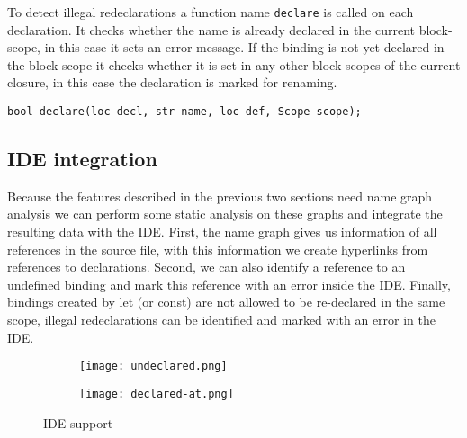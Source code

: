 To detect illegal redeclarations a function name \lstinline$declare$ is called on each declaration. It checks whether the name is already declared in the current block-scope, in this case it sets an error message. If the binding is not yet declared in the block-scope it checks whether it is set in any other block-scopes of the current closure, in this case the declaration is marked for renaming.

\begin{lstlisting}[language=rascal]
bool declare(loc decl, str name, loc def, Scope scope);
\end{lstlisting}

\subsection{IDE integration}
Because the features described in the previous two sections need name graph analysis we can perform some static analysis on these graphs and integrate the resulting data with the IDE. First, the name graph gives us information of all references in the source file, with this information we create hyperlinks from references to declarations. Second, we can also identify a reference to an undefined binding and mark this reference with an error inside the IDE. Finally, bindings created by let (or const) are not allowed to be re-declared in the same scope, illegal redeclarations can be identified and marked with an error in the IDE.

\begin{figure}
\centering

\begin{subfigure}{.49\textwidth}
	\centering
	\texttt{[image: undeclared.png]}
\end{subfigure}\hfill%
\begin{subfigure}{.49\textwidth}
	\centering	
	\texttt{[image: declared-at.png]}
\end{subfigure}

\caption{IDE support}
\end{figure}